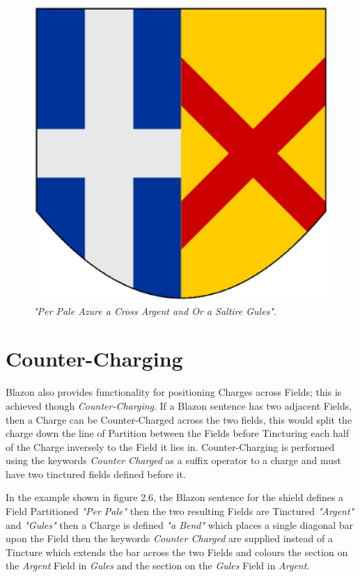 
\begin{figure}[H]
  \centering
    \includegraphics[width=\textwidth]{blazon/images/perpaleazureacrossargent.eps}
  \caption{\emph{"Per Pale Azure a Cross Argent and Or a Saltire Gules"}.}
  
\end{figure}

\section{Counter-Charging}

Blazon also provides functionality for positioning Charges across Fields; this is achieved though \emph{Counter-Charging}.  If a Blazon sentence has two adjacent Fields, then a Charge can be Counter-Charged across the two fields, this would split the charge down the line of Partition between the Fields before Tincturing each half of the Charge inversely to the Field it lies in.  Counter-Charging is performed using the keywords \emph{Counter Charged} as a suffix operator to a charge and must have two tinctured fields defined before it. 

In the example shown in figure 2.6, the Blazon sentence for the shield defines a Field Partitioned \emph{"Per Pale"} then the two resulting Fields are Tinctured \emph{"Argent"} and \emph{"Gules"} then a Charge is defined \emph{"a Bend"} which places a single diagonal bar upon the Field then the keywords \emph{Counter Charged} are supplied instead of a Tincture which extends the bar across the two Fields and colours the section on the \emph{Argent} Field in \emph{Gules} and the section on the \emph{Gules} Field in \emph{Argent}.


